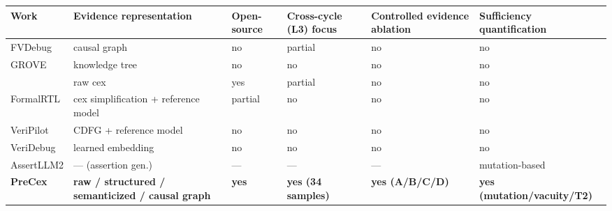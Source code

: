 \documentclass[
  11pt,
]{article}
\newcounter{none} %
\begin{document}
{\def\LTcaptype{none} %
\begin{longtable}[]{@{}
  >{\raggedright\arraybackslash}p{}
  >{\raggedright\arraybackslash}p{}
  >{\raggedright\arraybackslash}p{}
  >{\raggedright\arraybackslash}p{}
  >{\raggedright\arraybackslash}p{}
  >{\raggedright\arraybackslash}p{}@{}}
\toprule\noalign{}
\begin{minipage}[b]{\linewidth}\raggedright
Work
\end{minipage} & \begin{minipage}[b]{\linewidth}\raggedright
Evidence representation
\end{minipage} & \begin{minipage}[b]{\linewidth}\raggedright
Open-source
\end{minipage} & \begin{minipage}[b]{\linewidth}\raggedright
Cross-cycle (L3) focus
\end{minipage} & \begin{minipage}[b]{\linewidth}\raggedright
Controlled evidence ablation
\end{minipage} & \begin{minipage}[b]{\linewidth}\raggedright
Sufficiency quantification
\end{minipage} \\
\midrule\noalign{}
\endhead
\bottomrule\noalign{}
\endlastfoot
FVDebug & causal graph & no & partial & no & no \\
GROVE & knowledge tree & no & no & no & no \\
2607.28877 & raw cex & yes & partial & no & no \\
FormalRTL & cex simplification + reference model & partial & no & no & no \\
VeriPilot & CDFG + reference model & no & no & no & no \\
VeriDebug & learned embedding & no & no & no & no \\
AssertLLM2 & --- (assertion gen.) & --- & --- & --- & mutation-based \\
\textbf{PreCex} & \textbf{raw / structured / semanticized / causal graph} & \textbf{yes} & \textbf{yes (34 samples)} & \textbf{yes (A/B/C/D)} & \textbf{yes (mutation/vacuity/T2)} \\
\end{longtable}
}
\end{document}
